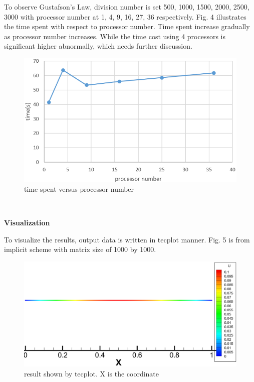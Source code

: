 \documentclass[a4paper,10pt]{article}
\begin{document}
To observe Gustafson's Law, division number is set 500, 1000, 1500, 2000, 2500, 3000 with processor number at 1, 4, 9, 16, 27, 36 respectively. Fig. 4 illustrates the time spent with respect to processor number. Time spent increase gradually as processor number increases. While the time cost using 4 processors is significant higher abnormally, which needs further discussion. 
\begin{figure}[h]
	\centering
	\includegraphics[scale=0.6]{Gustafson.png}
	\caption{time spent versus processor number}
\end{figure} \\
\clearpage

\large \textbf {Visualization}

To visualize the results, output data is written in tecplot manner. Fig. 5 is from implicit scheme with matrix size of 1000 by 1000. 
\begin{figure}[h]
	\centering
	\includegraphics[scale=0.2]{result_in_tecplot.png}
	\caption{result shown by tecplot. X is the coordinate}
\end{figure} \\
\end{document}
